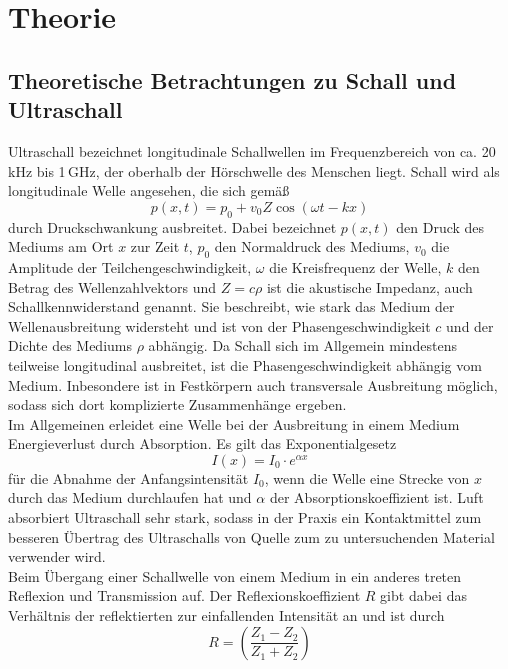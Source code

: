\section{Theorie}
\label{sec:Theorie}
\subsection{Theoretische Betrachtungen zu Schall und Ultraschall}
\label{subsec:theorie1}
Ultraschall bezeichnet longitudinale Schallwellen im Frequenzbereich von ca.
20\,kHz bis 1\,GHz, der oberhalb der Hörschwelle des Menschen liegt.
Schall wird als longitudinale Welle angesehen, die sich gemäß
\begin{equation}
  p(x,t) = p_0 + v_0 Z \cos(\omega t - kx)
\end{equation}
durch Druckschwankung ausbreitet. Dabei bezeichnet $p(x,t)$ den Druck des Mediums
am Ort $x$ zur Zeit $t$, $p_0$ den Normaldruck des Mediums, $v_0$ die Amplitude der Teilchengeschwindigkeit,
$\omega$ die Kreisfrequenz der Welle, $k$ den Betrag des Wellenzahlvektors und $Z = c \rho$ ist die akustische
Impedanz, auch Schallkennwiderstand genannt. Sie beschreibt, wie stark das Medium
der Wellenausbreitung widersteht und ist von der Phasengeschwindigkeit $c$ und der
Dichte des Mediums $\rho$ abhängig. Da Schall sich im Allgemein mindestens teilweise
longitudinal ausbreitet, ist die Phasengeschwindigkeit abhängig vom Medium. Inbesondere
ist in Festkörpern auch transversale Ausbreitung möglich, sodass sich dort komplizierte Zusammenhänge
ergeben.\\
Im Allgemeinen erleidet eine Welle bei der Ausbreitung in einem Medium Energieverlust
durch Absorption. Es gilt das Exponentialgesetz
\begin{equation}
  I(x) = I_0 \cdot e^{\alpha x}
\end{equation}
für die Abnahme der Anfangsintensität $I_0$, wenn die Welle eine Strecke von $x$ durch
das Medium durchlaufen hat und $\alpha$ der Absorptionskoeffizient ist.
Luft absorbiert Ultraschall sehr stark, sodass in der Praxis ein Kontaktmittel
zum besseren Übertrag des Ultraschalls von Quelle zum zu untersuchenden Material
verwender wird.\\
Beim Übergang einer Schallwelle von einem Medium in ein anderes treten Reflexion und
Transmission auf. Der Reflexionskoeffizient $R$ gibt dabei das Verhältnis der reflektierten
zur einfallenden Intensität an und ist durch
\begin{equation}
R = \left( \frac{Z_1-Z_2}{Z_1+Z_2} \right)
\end{equation}
